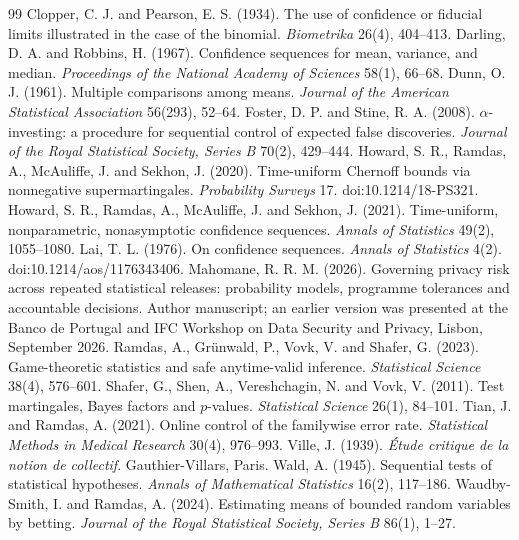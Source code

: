 \documentclass{jpc}
\begin{document}
\begin{thebibliography}{99}\small
{} Clopper, C. J. and Pearson, E. S. (1934). The use of confidence or fiducial limits illustrated in the case of the binomial. \emph{Biometrika} 26(4), 404--413.
 Darling, D. A. and Robbins, H. (1967). Confidence sequences for mean, variance, and median. \emph{Proceedings of the National Academy of Sciences} 58(1), 66--68.
 Dunn, O. J. (1961). Multiple comparisons among means. \emph{Journal of the American Statistical Association} 56(293), 52--64.
 Foster, D. P. and Stine, R. A. (2008). $\alpha$-investing: a procedure for sequential control of expected false discoveries. \emph{Journal of the Royal Statistical Society, Series B} 70(2), 429--444.
 Howard, S. R., Ramdas, A., McAuliffe, J. and Sekhon, J. (2020). Time-uniform Chernoff bounds via nonnegative supermartingales. \emph{Probability Surveys} 17. doi:10.1214/18-PS321.
 Howard, S. R., Ramdas, A., McAuliffe, J. and Sekhon, J. (2021). Time-uniform, nonparametric, nonasymptotic confidence sequences. \emph{Annals of Statistics} 49(2), 1055--1080.
 Lai, T. L. (1976). On confidence sequences. \emph{Annals of Statistics} 4(2). doi:10.1214/aos/1176343406.
 Mahomane, R. R. M. (2026). Governing privacy risk across repeated statistical releases: probability models, programme tolerances and accountable decisions. Author manuscript; an earlier version was presented at the Banco de Portugal and IFC Workshop on Data Security and Privacy, Lisbon, September 2026.
 Ramdas, A., Gr\"unwald, P., Vovk, V. and Shafer, G. (2023). Game-theoretic statistics and safe anytime-valid inference. \emph{Statistical Science} 38(4), 576--601.
 Shafer, G., Shen, A., Vereshchagin, N. and Vovk, V. (2011). Test martingales, Bayes factors and $p$-values. \emph{Statistical Science} 26(1), 84--101.
 Tian, J. and Ramdas, A. (2021). Online control of the familywise error rate. \emph{Statistical Methods in Medical Research} 30(4), 976--993.
 Ville, J. (1939). \emph{\'Etude critique de la notion de collectif}. Gauthier-Villars, Paris.
 Wald, A. (1945). Sequential tests of statistical hypotheses. \emph{Annals of Mathematical Statistics} 16(2), 117--186.
 Waudby-Smith, I. and Ramdas, A. (2024). Estimating means of bounded random variables by betting. \emph{Journal of the Royal Statistical Society, Series B} 86(1), 1--27.
\end{thebibliography}
\end{document}
